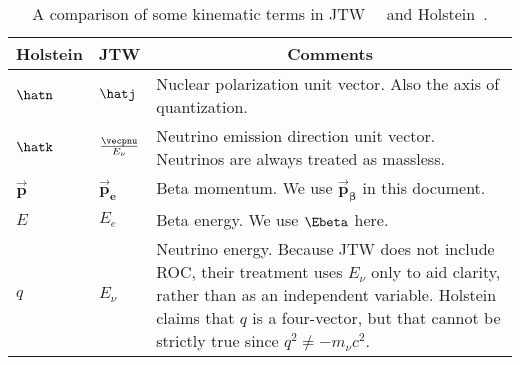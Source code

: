 %
%
%
\renewcommand{\arraystretch}{1.6}
\begin{table}[h!!!!t]
	\begin{center}
	\begin{tabular}{ | l | l | p{3.35in} | }
		\multicolumn{1}{c}{Holstein} 				& \multicolumn{1}{c}{JTW} 					& \multicolumn{1}{c}{Comments}
		\\  \hline
		$\hatn$ 									& $\hatj$									& Nuclear polarization unit vector.  Also the axis of quantization.  %
		\\  \hline
		$\hatk$ 									& $\frac{\vecpnu}{E_\nu}$					& Neutrino emission direction unit vector.  Neutrinos are always treated as massless.
		\\  \hline
		$\bm{\vec{p}} $								& $\bm{\vec{p}_e}$							& Beta momentum.  We use $\bm{\vec{p}_\beta}$ in this document.
		\\  \hline
		$E$											& $E_e$										& Beta energy.  We use $\Ebeta$ here.
		\\  \hline
		$q$											& $E_\nu$									& Neutrino energy.  Because JTW does not include ROC, their treatment uses $E_\nu$ only to aid clarity, rather than as an independent variable.  Holstein claims that $q$ is a four-vector, but that cannot be strictly true since $q^2 \neq - m_\nu c^2$.
		\\  \hline
	\end{tabular}
	\end{center}
	\caption[Notation Guide]{A comparison of some kinematic terms in JTW~\cite{jtw}~\cite{jtw_coulomb} and Holstein~\cite{holstein}.}
	\label{table:compare_notation}
\end{table}
\renewcommand{\arraystretch}{1}
%
%